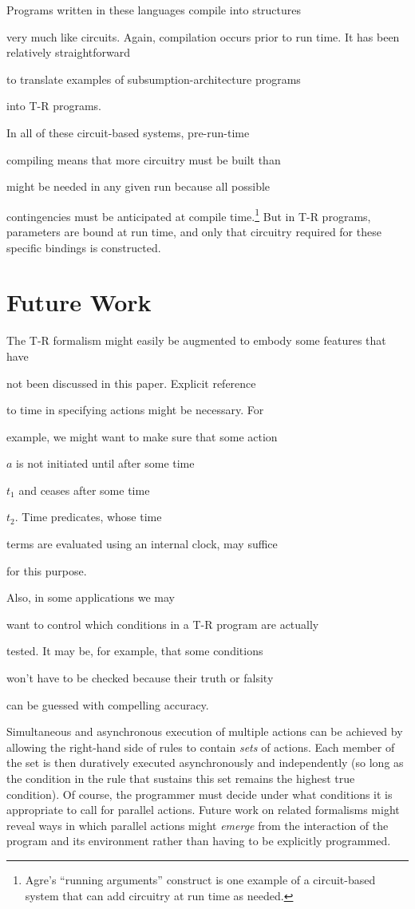 Programs written in these languages compile into structures 

very much like circuits.   Again, compilation occurs prior to run time.  It  
has been relatively straightforward 

to translate examples of subsumption-architecture programs 

into T-R programs.

In all of these circuit-based systems, pre-run-time 

compiling means that more circuitry must be built than 

might be needed in any given run because all possible 

contingencies must be anticipated at compile time.\footnote{Agre's ``running  
arguments'' construct \cite{Agre} is one example of a circuit-based system  
that can add circuitry at run time as needed.} But in T-R programs,  
parameters are bound at run time, and only that circuitry required for these  
specific bindings is constructed.  


\section{Future Work}

The T-R formalism might easily be augmented to embody some features that have 

not been  discussed in this paper.   Explicit reference 

to time in specifying actions might be necessary.  For 

example, we might want to make sure that some action 

$a$  is not initiated until after some time 

$t_1$ and ceases after some time 

$t_2$.  Time predicates, whose time 

terms are evaluated using an internal clock, may suffice 

for this purpose.  


Also, in some applications we may 

want to control which conditions in a T-R program are actually 

tested.  It may be, for example, that some conditions 

won't have to be checked because their truth or falsity 

can be guessed with compelling accuracy.   


Simultaneous and asynchronous execution of multiple actions can be achieved  
by allowing the right-hand side of rules to contain {\it sets} of actions.   
Each member of the set is then duratively executed asynchronously and  
independently (so long as the condition in the rule that sustains this set  
remains the highest true condition).  Of course, the programmer must decide  
under what conditions it is appropriate to call for parallel actions.  Future  
work on related formalisms might reveal ways in which parallel actions might  
{\it emerge} from the interaction of the program and its environment rather  
than having to be explicitly programmed.

